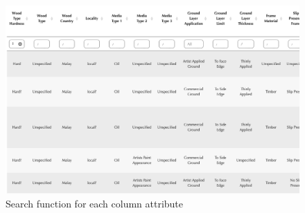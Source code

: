 \documentclass[11pt, oneside]{article}
\begin{document}
\begin{figure}[H]
    \centering
\includegraphics[scale=0.35]{images/wood_type_search.png}
    \caption{Search function for each column attribute}
    \label{wood_type_search_2}
\end{figure}

\newpage
\printbibliography
\end{document}
